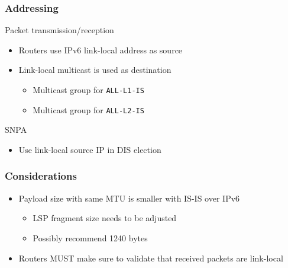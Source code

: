 \documentclass[12pt]{beamer}
\begin{document}
\begin{frame}
  \frametitle{Addressing}
  \begin{block}{Packet transmission/reception}
    \begin{itemize}
      \item Routers use IPv6 link-local address as source
      \item Link-local multicast is used as destination
      \begin{itemize}
        \item Multicast group for \texttt{ALL-L1-IS}
        \item Multicast group for \texttt{ALL-L2-IS}
      \end{itemize}
    \end{itemize}
  \end{block}
  \begin{block}{SNPA}
    \begin{itemize}
      \item Use link-local source IP in DIS election
    \end{itemize}
  \end{block}
\end{frame}

\begin{frame}
  \frametitle{Considerations}
  \begin{itemize}
    \item Payload size with same MTU is smaller with IS-IS over IPv6
      \begin{itemize}
        \item LSP fragment size needs to be adjusted
        \item Possibly recommend 1240 bytes
      \end{itemize}
    \item Routers MUST make sure to validate that
          received packets are link-local
  \end{itemize}
\end{frame}
\end{document}
